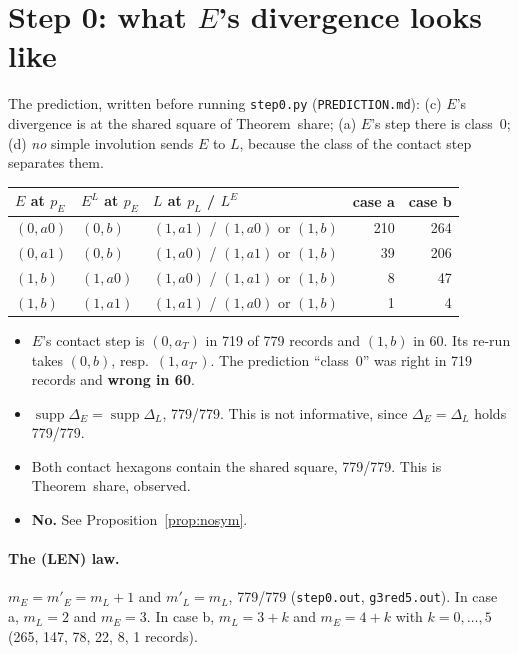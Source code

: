 \documentclass[11pt]{article}
\theoremstyle{definition}\newtheorem{definition}[theorem]{Definition}\newtheorem{remark}[theorem]{Remark}
\begin{document}
\section{Step 0: what $E$'s divergence looks like}\label{sec:step0}
The prediction, written before running \texttt{step0.py} (\texttt{PREDICTION.md}): (c) $E$'s divergence is at the shared square of Theorem~share; (a) $E$'s step there is class~0; (d) \emph{no} simple involution sends $E$ to $L$, because the class of the contact step separates them.
\begin{center}\small\begin{tabular}{lllrr}\toprule
$E$ at $p_E$ & $E^L$ at $p_E$ & $L$ at $p_L$ / $L^E$ & case a & case b\\\midrule
$(0,a0)$ & $(0,b)$ & $(1,a1)$ / $(1,a0)$ or $(1,b)$ & 210 & 264\\
$(0,a1)$ & $(0,b)$ & $(1,a0)$ / $(1,a1)$ or $(1,b)$ & 39 & 206\\
$(1,b)$ & $(1,a0)$ & $(1,a0)$ / $(1,a1)$ or $(1,b)$ & 8 & 47\\
$(1,b)$ & $(1,a1)$ & $(1,a1)$ / $(1,a0)$ or $(1,b)$ & 1 & 4\\\bottomrule
\end{tabular}\end{center}
\begin{itemize}
\item[(a)] $E$'s contact step is $(0,a_T)$ in 719 of 779 records and $(1,b)$ in 60. Its re-run takes $(0,b)$, resp.\ $(1,a_{T'})$. The prediction ``class~0'' was right in 719 records and \textbf{wrong in 60}.
\item[(b)] $\operatorname{supp}\Delta_E=\operatorname{supp}\Delta_L$, 779/779. This is not informative, since $\Delta_E=\Delta_L$ holds 779/779.
\item[(c)] Both contact hexagons contain the shared square, 779/779. This is Theorem~share, observed.
\item[(d)] \textbf{No.} See Proposition~\ref{prop:nosym}.
\end{itemize}

\paragraph{The (LEN) law.} $m_E=m'_E=m_L+1$ and $m'_L=m_L$, 779/779 (\texttt{step0.out}, \texttt{g3red5.out}). In case a, $m_L=2$ and $m_E=3$. In case b, $m_L=3+k$ and $m_E=4+k$ with $k=0,\dots,5$ (265, 147, 78, 22, 8, 1 records).
\end{document}
